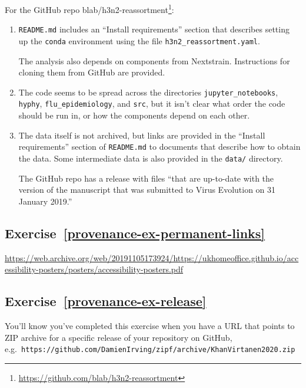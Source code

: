 \documentclass[
]{krantz}
\renewcommand{\href}[2]{#2\footnote{\url{#1}}}
\begin{document}
For the GitHub repo \href{https://github.com/blab/h3n2-reassortment}{blab/h3n2-reassortment}:

\begin{enumerate}
\def\labelenumi{\arabic{enumi}.}
\item
  \texttt{README.md} includes an ``Install requirements'' section that describes setting up the \texttt{conda} environment using the file \texttt{h3n2\_reassortment.yaml}.

  The analysis also depends on components from Nextstrain. Instructions for cloning them from GitHub are provided.
\item
  The code seems to be spread across the directories \texttt{jupyter\_notebooks}, \texttt{hyphy}, \texttt{flu\_epidemiology}, and \texttt{src}, but it isn't clear what order the code should be run in, or how the components depend on each other.
\item
  The data itself is not archived, but links are provided in the ``Install requirements'' section of \texttt{README.md} to documents that describe how to obtain the data. Some intermediate data is also provided in the \texttt{data/} directory.

  The GitHub repo has a release with files ``that are up-to-date with the version of the manuscript that was submitted to Virus Evolution on 31 January 2019.''
\end{enumerate}

\hypertarget{exercise-refprovenance-ex-permanent-links}{%
\subsection*{Exercise~\ref{provenance-ex-permanent-links}}\label{exercise-refprovenance-ex-permanent-links}}


\url{https://web.archive.org/web/20191105173924/https://ukhomeoffice.github.io/accessibility-posters/posters/accessibility-posters.pdf}

\hypertarget{exercise-refprovenance-ex-release}{%
\subsection*{Exercise~\ref{provenance-ex-release}}\label{exercise-refprovenance-ex-release}}


You'll know you've completed this exercise when you have a URL
that points to ZIP archive for a specific release of your repository on GitHub,
e.g.~\texttt{https://github.com/DamienIrving/zipf/archive/KhanVirtanen2020.zip}
\end{document}
